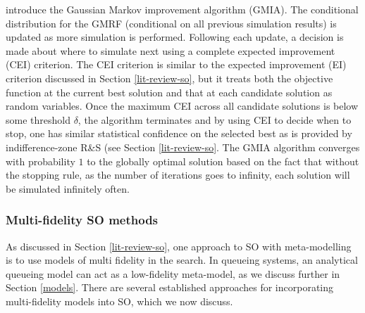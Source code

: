 \documentclass[12pt,a4paper]{article}
\begin{document}
\citet{l2019gaussian} introduce the Gaussian Markov improvement algorithm (GMIA). The conditional distribution for the GMRF (conditional on all previous simulation results) is updated as more simulation is performed. Following each update, a decision is made about where to simulate next using a complete expected improvement (CEI) criterion. The CEI criterion is similar to the expected improvement (EI) criterion discussed in Section \ref{lit-review-so}, but it treats both the objective function at the current best solution and that at each candidate solution as random variables. Once the maximum CEI across all candidate solutions is below some threshold $\delta$, the algorithm terminates and by using CEI to decide when to stop, one has similar statistical confidence on the selected best as is provided by indifference-zone R\&S (see Section \ref{lit-review-so}. The GMIA algorithm converges with probability $1$ to the globally optimal solution based on the fact that without the stopping rule, as the number of iterations goes to infinity, each solution will be simulated infinitely often.

\subsubsection{Multi-fidelity SO methods}\label{mfso-methods}

As discussed in Section \ref{lit-review-so}, one approach to SO with meta-modelling is to use models of multi fidelity in the search. In queueing systems, an analytical queueing model can act as a low-fidelity meta-model, as we discuss further in Section \ref{models}. There are several established approaches for incorporating multi-fidelity models into SO, which we now discuss.
\end{document}
